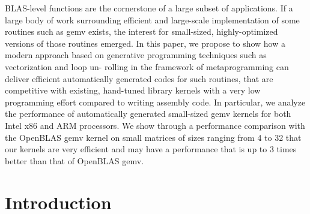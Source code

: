 \documentclass[../main]{subfiles}
\begin{document}
BLAS-level functions are the cornerstone of a large
subset of applications. If a large body of work surrounding
efficient and large-scale implementation of some routines such
as gemv exists, the interest for small-sized, highly-optimized
versions of those routines emerged. In this paper, we propose
to show how a modern \cpp approach based on generative
programming techniques such as vectorization and loop un-
rolling in the framework of metaprogramming can deliver
efficient automatically generated codes for such routines, that
are competitive with existing, hand-tuned library kernels with
a very low programming effort compared to writing assembly
code. In particular, we analyze the performance of automatically
generated small-sized gemv kernels for both Intel x86 and ARM
processors. We show through a performance comparison with
the OpenBLAS gemv kernel on small matrices of sizes ranging
from 4 to 32 that our \cpp kernels are very efficient and may
have a performance that is up to 3 times better than that of
OpenBLAS gemv.

\section{
  Introduction
}
\end{document}
